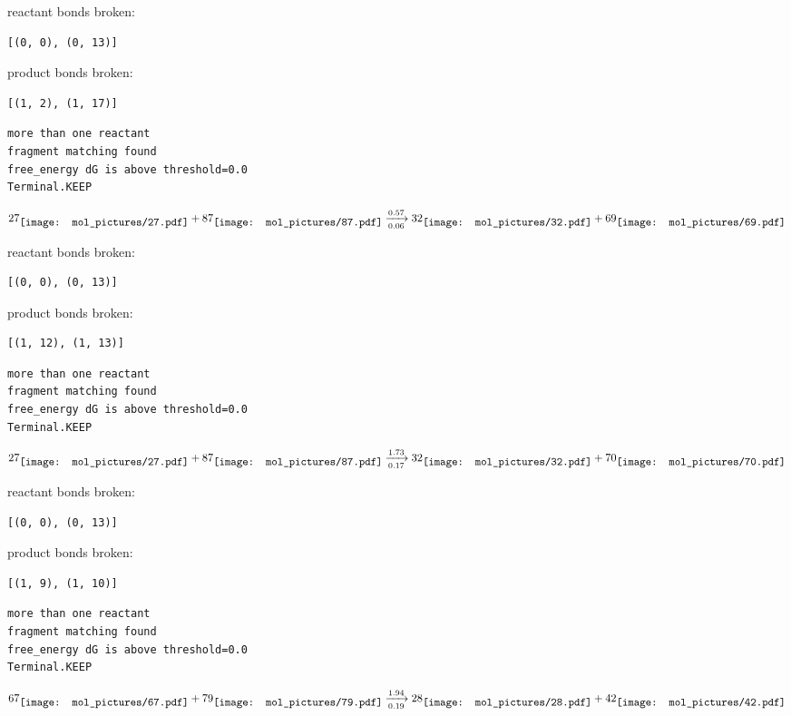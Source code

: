 \documentclass{article}
\begin{document}
reactant bonds broken:\begin{verbatim}
[(0, 0), (0, 13)]
\end{verbatim}
product bonds broken:\begin{verbatim}
[(1, 2), (1, 17)]
\end{verbatim}




\vspace{1cm}
\begin{verbatim}
more than one reactant
fragment matching found
free_energy dG is above threshold=0.0
Terminal.KEEP
\end{verbatim}
$$
27
\raisebox{-.5\height}{\texttt{[image: mol\_pictures/27.pdf]}}
+
87
\raisebox{-.5\height}{\texttt{[image: mol\_pictures/87.pdf]}}
\xrightarrow[0.06]{0.57}
32
\raisebox{-.5\height}{\texttt{[image: mol\_pictures/32.pdf]}}
+
69
\raisebox{-.5\height}{\texttt{[image: mol\_pictures/69.pdf]}}
$$


reactant bonds broken:\begin{verbatim}
[(0, 0), (0, 13)]
\end{verbatim}
product bonds broken:\begin{verbatim}
[(1, 12), (1, 13)]
\end{verbatim}




\vspace{1cm}
\begin{verbatim}
more than one reactant
fragment matching found
free_energy dG is above threshold=0.0
Terminal.KEEP
\end{verbatim}
$$
27
\raisebox{-.5\height}{\texttt{[image: mol\_pictures/27.pdf]}}
+
87
\raisebox{-.5\height}{\texttt{[image: mol\_pictures/87.pdf]}}
\xrightarrow[0.17]{1.73}
32
\raisebox{-.5\height}{\texttt{[image: mol\_pictures/32.pdf]}}
+
70
\raisebox{-.5\height}{\texttt{[image: mol\_pictures/70.pdf]}}
$$


reactant bonds broken:\begin{verbatim}
[(0, 0), (0, 13)]
\end{verbatim}
product bonds broken:\begin{verbatim}
[(1, 9), (1, 10)]
\end{verbatim}




\vspace{1cm}
\begin{verbatim}
more than one reactant
fragment matching found
free_energy dG is above threshold=0.0
Terminal.KEEP
\end{verbatim}
$$
67
\raisebox{-.5\height}{\texttt{[image: mol\_pictures/67.pdf]}}
+
79
\raisebox{-.5\height}{\texttt{[image: mol\_pictures/79.pdf]}}
\xrightarrow[0.19]{1.94}
28
\raisebox{-.5\height}{\texttt{[image: mol\_pictures/28.pdf]}}
+
42
\raisebox{-.5\height}{\texttt{[image: mol\_pictures/42.pdf]}}
$$
\end{document}
